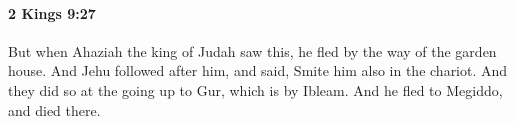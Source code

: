 
		\paragraph{2 Kings 9:27} %
			\label{2KINGS-9-27}

			But when Ahaziah the king of Judah saw this, he fled by the way of the garden house. And Jehu followed after him, and said, Smite him also in the chariot. And they did so at the going up to Gur, which is by Ibleam. And he fled to Megiddo, and died there.


